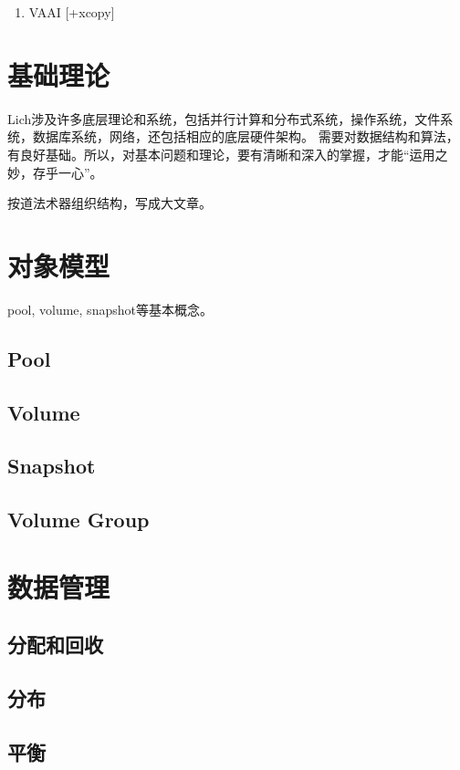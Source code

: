 \documentclass[UTF8]{ctexart}
\begin{document}
\begin{enumerate}
    \item VAAI [+xcopy]
\end{enumerate}

\section{基础理论}

Lich涉及许多底层理论和系统，包括并行计算和分布式系统，操作系统，文件系统，数据库系统，网络，还包括相应的底层硬件架构。
需要对数据结构和算法，有良好基础。所以，对基本问题和理论，要有清晰和深入的掌握，才能“运用之妙，存乎一心”。

按道法术器组织结构，写成大文章。

\section{对象模型}

pool, volume, snapshot等基本概念。

\subsection{Pool}
\subsection{Volume}
\subsection{Snapshot}
\subsection{Volume Group}

\section{数据管理}

\subsection{分配和回收}
\subsection{分布}
\subsection{平衡}
\end{document}
